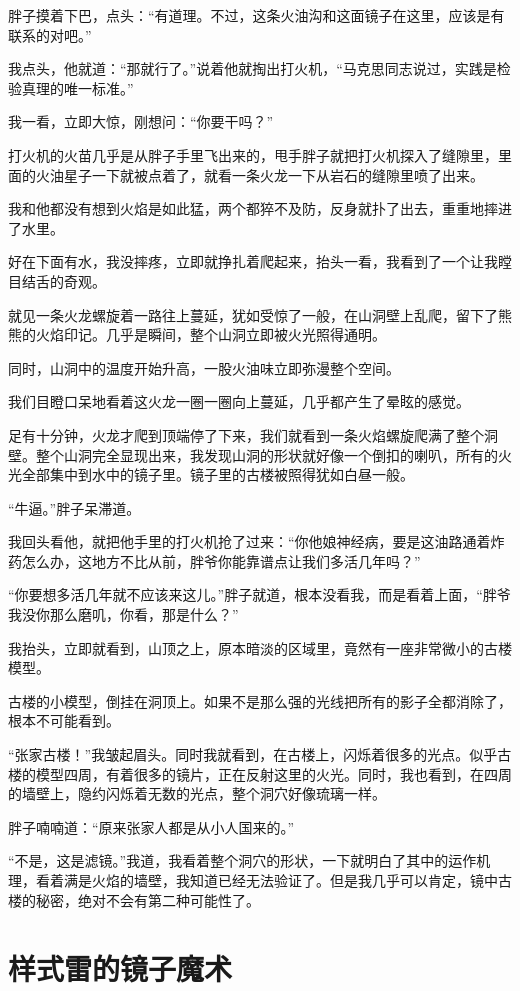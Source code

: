 胖子摸着下巴，点头：“有道理。不过，这条火油沟和这面镜子在这里，应该是有联系的对吧。”

我点头，他就道：“那就行了。”说着他就掏出打火机，“马克思同志说过，实践是检验真理的唯一标准。”

我一看，立即大惊，刚想问：“你要干吗？”

打火机的火苗几乎是从胖子手里飞出来的，甩手胖子就把打火机探入了缝隙里，里面的火油星子一下就被点着了，就看一条火龙一下从岩石的缝隙里喷了出来。

我和他都没有想到火焰是如此猛，两个都猝不及防，反身就扑了出去，重重地摔进了水里。

好在下面有水，我没摔疼，立即就挣扎着爬起来，抬头一看，我看到了一个让我瞠目结舌的奇观。

就见一条火龙螺旋着一路往上蔓延，犹如受惊了一般，在山洞壁上乱爬，留下了熊熊的火焰印记。几乎是瞬间，整个山洞立即被火光照得通明。

同时，山洞中的温度开始升高，一股火油味立即弥漫整个空间。

我们目瞪口呆地看着这火龙一圈一圈向上蔓延，几乎都产生了晕眩的感觉。

足有十分钟，火龙才爬到顶端停了下来，我们就看到一条火焰螺旋爬满了整个洞壁。整个山洞完全显现出来，我发现山洞的形状就好像一个倒扣的喇叭，所有的火光全部集中到水中的镜子里。镜子里的古楼被照得犹如白昼一般。

“牛逼。”胖子呆滞道。

我回头看他，就把他手里的打火机抢了过来：“你他娘神经病，要是这油路通着炸药怎么办，这地方不比从前，胖爷你能靠谱点让我们多活几年吗？”

“你要想多活几年就不应该来这儿。”胖子就道，根本没看我，而是看着上面，“胖爷我没你那么磨叽，你看，那是什么？”

我抬头，立即就看到，山顶之上，原本暗淡的区域里，竟然有一座非常微小的古楼模型。

古楼的小模型，倒挂在洞顶上。如果不是那么强的光线把所有的影子全都消除了，根本不可能看到。

“张家古楼！”我皱起眉头。同时我就看到，在古楼上，闪烁着很多的光点。似乎古楼的模型四周，有着很多的镜片，正在反射这里的火光。同时，我也看到，在四周的墙壁上，隐约闪烁着无数的光点，整个洞穴好像琉璃一样。

胖子喃喃道：“原来张家人都是从小人国来的。”

“不是，这是滤镜。”我道，我看着整个洞穴的形状，一下就明白了其中的运作机理，看着满是火焰的墙壁，我知道已经无法验证了。但是我几乎可以肯定，镜中古楼的秘密，绝对不会有第二种可能性了。

\chapter{样式雷的镜子魔术}

